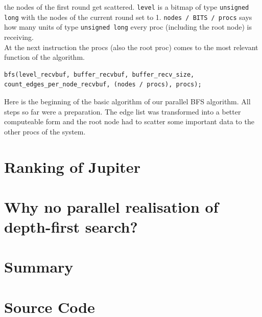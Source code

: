 \documentclass[12pt,a4paper]{article}
\begin{document}
the nodes of the first round get scattered. \lstinline{level} is a bitmap of type \lstinline{unsigned long} with the nodes of the current round set to 1. \lstinline{nodes / BITS / procs} says how many units of type \lstinline{unsigned long} every proc (including the root node) is receiving. \\
At the next instruction the procs (also the root proc) comes to the most relevant function of the algorithm.
\begin{lstlisting}
bfs(level_recvbuf, buffer_recvbuf, buffer_recv_size, count_edges_per_node_recvbuf, (nodes / procs), procs);
\end{lstlisting}
Here is the beginning of the basic algorithm of our parallel BFS algorithm. All steps so far were a preparation. The edge list was transformed into a better computeable form and the root node had to scatter some important data to the other procs of the system.

\section{Ranking of Jupiter}
\label{sec:ranking}

\section{Why no parallel realisation of depth-first search?}
\label{sec:depth-first search}

\section{Summary}
\label{sec:summary}

\clearpage

\nocite{*}


\clearpage
\appendix
\section{Source Code}
\label{sec:sourcecode}

\clearpage

\clearpage


\clearpage
\end{document}
